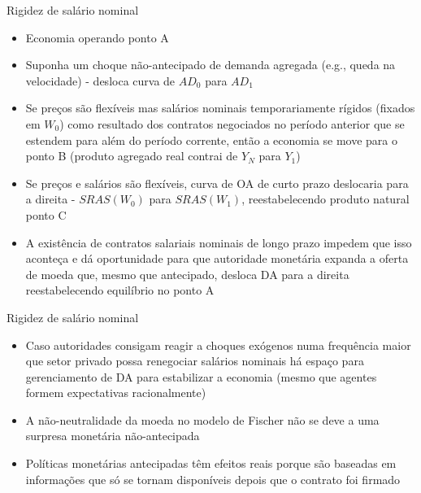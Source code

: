 \documentclass[10pt]{beamer}
\begin{document}
\begin{frame}{Rigidez de salário nominal}
    \begin{itemize}
        \item Economia operando ponto A\bigskip
        \item Suponha um choque não-antecipado de demanda agregada (e.g., queda na velocidade) - desloca curva de $AD_0$ para $AD_1$\bigskip
        \item Se preços são flexíveis mas salários nominais temporariamente rígidos (fixados em $W_0$) como resultado dos contratos negociados no período anterior que se estendem para além do período corrente, então a economia se move para o ponto B (produto agregado real contrai de $Y_N$ para $Y_1$)\bigskip
        \item Se preços e salários são flexíveis, curva de OA de curto prazo deslocaria para a direita - $SRAS(W_0)$ para $SRAS(W_1)$, reestabelecendo produto natural ponto C\bigskip
        \item A existência de contratos salariais nominais de longo prazo impedem que isso aconteça e dá oportunidade para que autoridade monetária expanda a oferta de moeda que, mesmo que antecipado, desloca DA para a direita reestabelecendo equilíbrio no ponto A
    \end{itemize}
\end{frame}

\begin{frame}{Rigidez de salário nominal}
    \begin{itemize}
        \item Caso autoridades consigam reagir a choques exógenos numa frequência maior que setor privado possa renegociar salários nominais há espaço para gerenciamento de DA para estabilizar a economia (mesmo que agentes formem expectativas racionalmente)\bigskip
        \item A não-neutralidade da moeda no modelo de Fischer não se deve a uma surpresa monetária não-antecipada\bigskip
        \item Políticas monetárias antecipadas têm efeitos reais porque são baseadas em informações que só se tornam disponíveis depois que o contrato foi firmado
    \end{itemize}
\end{frame}
\end{document}
